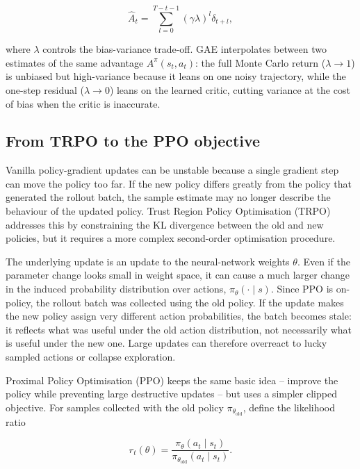 \begin{equation}
\hat{A}_t =
\sum_{l=0}^{T-t-1} (\gamma \lambda)^l \delta_{t+l},
\end{equation}

where $\lambda$ controls the bias-variance trade-off. GAE interpolates between
two estimates of the same advantage $A^\pi(s_t,a_t)$: the full Monte Carlo
return ($\lambda\to1$) is unbiased but high-variance because it leans on one
noisy trajectory, while the one-step residual ($\lambda\to0$) leans on the
learned critic, cutting variance at the cost of bias when the critic is
inaccurate.

\subsection{From TRPO to the PPO objective}
Vanilla policy-gradient updates can be unstable because a single gradient step
can move the policy too far. If the new policy differs greatly from the policy
that generated the rollout batch, the sample estimate may no longer describe
the behaviour of the updated policy. Trust Region Policy Optimisation (TRPO)
addresses this by constraining the KL divergence between the old and new
policies, but it requires a more complex second-order optimisation
procedure.\cite{schulman_trpo_2015}

The underlying update is an update to the neural-network weights $\theta$. Even
if the parameter change looks small in weight space, it can cause a much larger
change in the induced probability distribution over actions,
$\pi_\theta(\cdot \mid s)$. Since PPO is on-policy, the rollout batch was
collected using the old policy. If the update makes the new policy assign very
different action probabilities, the batch becomes stale: it reflects what was
useful under the old action distribution, not necessarily what is useful under
the new one. Large updates can therefore overreact to lucky sampled actions or
collapse exploration.

Proximal Policy Optimisation (PPO) keeps the same basic idea -- improve the
policy while preventing large destructive updates -- but uses a simpler clipped
objective.\cite{schulman_ppo_2017} For samples collected with the old policy
$\pi_{\theta_{\mathrm{old}}}$, define the likelihood ratio

\begin{equation}
r_t(\theta) =
\frac{\pi_\theta(a_t\mid s_t)}
     {\pi_{\theta_{\mathrm{old}}}(a_t\mid s_t)}.
\end{equation}

